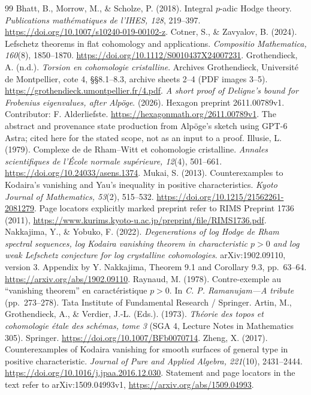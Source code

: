 \documentclass[11pt,a4paper]{article}
\theoremstyle{definition}\newtheorem{definition}[theorem]{Definition}
\theoremstyle{remark}\newtheorem{remark}[theorem]{Remark}
\numberwithin{equation}{section}
\begin{document}
\begin{thebibliography}{99}
Bhatt, B., Morrow, M., \& Scholze, P. (2018). Integral $p$-adic Hodge theory. \emph{Publications mathématiques de l'IHES, 128}, 219--397. \url{https://doi.org/10.1007/s10240-019-00102-z}.
Cotner, S., \& Zavyalov, B. (2024). Lefschetz theorems in flat cohomology and applications. \emph{Compositio Mathematica, 160}(8), 1850--1870. \url{https://doi.org/10.1112/S0010437X24007231}.
Grothendieck, A. (n.d.). \emph{Torsion en cohomologie cristalline}. Archives Grothendieck, Université de Montpellier, cote 4, \S\S8.1--8.3, archive sheets 2--4 (PDF images 3--5). \url{https://grothendieck.umontpellier.fr/4.pdf}.
\emph{A short proof of Deligne's bound for Frobenius eigenvalues, after Alpöge}. (2026). Hexagon preprint 2611.00789v1. Contributor: F. Alderliefste. \url{https://hexagonmath.org/2611.00789v1}. The abstract and provenance state production from Alpöge's sketch using GPT-6 Astra; cited here for the stated scope, not as an input to a proof.
Illusie, L. (1979). Complexe de de Rham--Witt et cohomologie cristalline. \emph{Annales scientifiques de l'École normale supérieure, 12}(4), 501--661. \url{https://doi.org/10.24033/asens.1374}.
Mukai, S. (2013). Counterexamples to Kodaira's vanishing and Yau's inequality in positive characteristics. \emph{Kyoto Journal of Mathematics, 53}(2), 515--532. \url{https://doi.org/10.1215/21562261-2081279}. Page locators explicitly marked preprint refer to RIMS Preprint 1736 (2011), \url{https://www.kurims.kyoto-u.ac.jp/preprint/file/RIMS1736.pdf}.
Nakkajima, Y., \& Yobuko, F. (2022). \emph{Degenerations of log Hodge de Rham spectral sequences, log Kodaira vanishing theorem in characteristic $p>0$ and log weak Lefschetz conjecture for log crystalline cohomologies}. arXiv:1902.09110, version 3. Appendix by Y. Nakkajima, Theorem 9.1 and Corollary 9.3, pp.~63--64. \url{https://arxiv.org/abs/1902.09110}.
Raynaud, M. (1978). Contre-exemple au ``vanishing theorem'' en caractéristique $p>0$. In \emph{C. P. Ramanujam---A tribute} (pp.~273--278). Tata Institute of Fundamental Research / Springer.
Artin, M., Grothendieck, A., \& Verdier, J.-L. (Eds.). (1973). \emph{Théorie des topos et cohomologie étale des schémas, tome 3} (SGA 4, Lecture Notes in Mathematics 305). Springer. \url{https://doi.org/10.1007/BFb0070714}.
Zheng, X. (2017). Counterexamples of Kodaira vanishing for smooth surfaces of general type in positive characteristic. \emph{Journal of Pure and Applied Algebra, 221}(10), 2431--2444. \url{https://doi.org/10.1016/j.jpaa.2016.12.030}. Statement and page locators in the text refer to arXiv:1509.04993v1, \url{https://arxiv.org/abs/1509.04993}.
\end{thebibliography}
\end{document}

